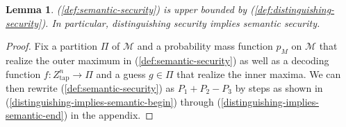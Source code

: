 \documentclass[journal]{IEEEtran}
\newcommand{\codebookpmf}{p}
\newcommand{\channelOut}{Z}
\newcommand{\channelOutWiretapper}{\channelOut_\mathrm{tap}}
\newcommand{\codebookBlocklength}{n}
\newcommand{\messageRV}{M}
\newcommand{\messageAlphabet}{\mathcal{M}}
\newcommand{\partition}{{\Pi}}
\newcommand{\wiretapperDecoder}{{f}}
\newcommand{\wiretapperGuesser}{{g}}
\newcommand{\semanticTotvarTerm}{{P_1}}
\newcommand{\semanticErrorTermOne}{{P_2}}
\newcommand{\semanticErrorTermTwo}{{P_3}}
\newtheorem{lemma}{Lemma}
\begin{document}
\begin{lemma}
\label{lemma:distinguishing-implies-semantic}
(\ref{def:semantic-security}) is upper bounded by (\ref{def:distinguishing-security}). In particular, distinguishing security implies semantic security.
\end{lemma}

\begin{proof}
Fix a partition $\partition$ of $\messageAlphabet$ and a probability mass function $\codebookpmf_\messageRV$ on $\messageAlphabet$ that realize the outer maximum in (\ref{def:semantic-security}) as well as a decoding function $\wiretapperDecoder: \channelOutWiretapper^\codebookBlocklength \rightarrow \partition$ and a guess $\wiretapperGuesser \in \partition$ that realize the inner maxima. We can then rewrite (\ref{def:semantic-security}) as $\semanticTotvarTerm + \semanticErrorTermOne - \semanticErrorTermTwo$ by steps as shown in (\ref{distinguishing-implies-semantic-begin}) through (\ref{distinguishing-implies-semantic-end}) in the appendix.


\end{proof}
\end{document}
